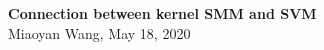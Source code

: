 \documentclass[11pt]{article}
\theoremstyle{plain}
\theoremstyle{definition}
\newcommand{\Hnorm}[1]{\left\lVert#1\right\rVert_{\tH_\alpha}}
\begin{document}
\begin{center}
{\bf \Large Connection between kernel SMM and SVM}\\
Miaoyan Wang, May 18, 2020\\
\end{center}

\vspace{.5cm}
\begin{comment}
\section{Model}
Key: Cartesian product of piecewise constant function representations. (has full generality...)

Let $\tY=\entry{y_{i_1,\ldots,i_K}}\in\{0,1\}^{d_1 \times \cdots \times d_K}$ be an order-$K$, $(d_1,\ldots,d_K)$-dimensional binary tensor. Let $\mxi^{(k)}=(\xi^{(k)}_1,\ldots,\xi^{(k)}_d)\in[0,1]^d$ be random vectors following (unknown) distributions $\mathbb{P}^{(k)}$ for all $k\in[K]$, and $\mxi^{(k)}$ and $\mxi^{(k')}$ are mutually independent for $k\neq k' \in[K]$. Assume that, conditional on $\{\mxi^{(k)}\}$, the entries of $\tY$ are independent sub-Gaussian distributed:
\[
\mathbb{E}\left(y_{i_1,\ldots,i_K}|\mxi \right)=f\left(\xi_{1,i_1},\ldots,\xi_{K,i_K}\right),\quad \text{for all } (i_1,\ldots,i_K)\in[d]\times \cdots \times [d],
\]
where $f\colon [0,1]^K\mapsto [0,1]$ is an unknown multivariate function belonging to a function class $f\in \tF_\alpha(L)$. Specifically, the function class is defined as
 \[ 
\tF_\alpha(L)=\{f\colon \text{Im}(f)\in[0,1]\ \text{and}\ \Hnorm{f}\leq L\},
\]
where $\alpha\in(0,1]$ is the smoothness parameter and $L>0$ is the H\"{o}lder norm bound for the functions in the class. 

Recall that the function H\"{o}lder norm $\Hnorm{f}$ is defined as
\[
\Hnorm{f}\stackrel{\text{def}}{=}\max_{|\omega|\leq \lfloor \alpha \rfloor}\sup_{\mx \in \tD} |\nabla_{\omega} f(\mx)|+\max_{|\omega| =\lfloor \alpha \rfloor}\sup_{\mx\neq \mx' \in \tD} {\nabla_{\omega} |f(\mx)-\nabla_{\omega} f(\mx')|\over \onenorm{\mx-\mx'}^{\alpha-\lfloor \alpha \rfloor}},
\]
where we have used the short-hand notion
\[
 \nabla_{\omega} f(\mx) ={\partial^{i_1+\cdots+i_K}\over \partial x^{i_1}_1\cdots \partial x^{i_K}_K} f(x_1,\ldots,x_k),
\]
for multi-indices $\omega=(i_1,\ldots,i_K)$ with $|\omega|=i_1+\cdots+i_K$, and $\mx=(x_1,\ldots,x_K)$ in the function domain. 



\end{comment}
\end{document}
